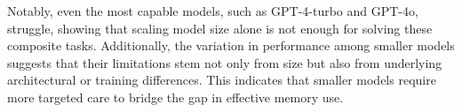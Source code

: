 Notably, even the most capable models, such as GPT-4-turbo and GPT-4o, struggle, showing that scaling model size alone is not enough for solving these composite tasks. Additionally, the variation in performance among smaller models suggests that their limitations stem not only from size but also from underlying architectural or training differences. This indicates that smaller models require more targeted care to bridge the gap in effective memory use.


